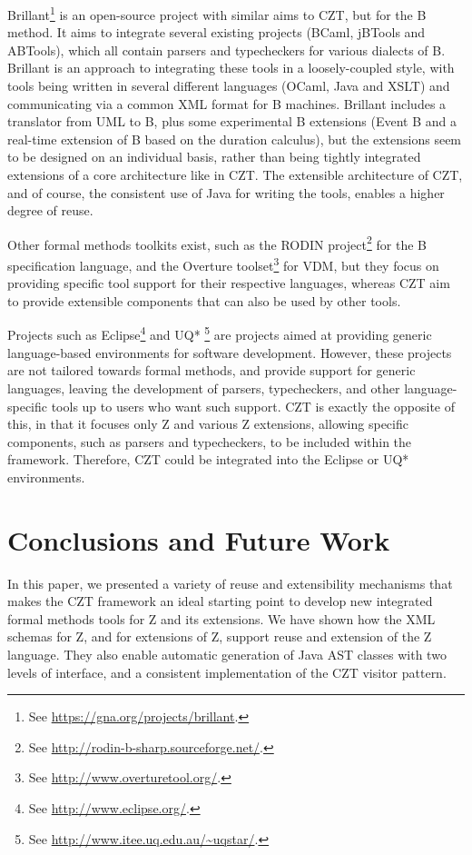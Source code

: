 \documentclass{llncs}
\begin{document}
  Brillant\footnote{See \url{https://gna.org/projects/brillant}.}  is
  an open-source project with similar aims to CZT, but for the B
  method. It aims to integrate several existing projects (BCaml,
  jBTools and ABTools), which all contain parsers and typecheckers for
  various dialects of B.  Brillant is an approach to integrating these
  tools in a loosely-coupled style, with tools being written in
  several different languages (OCaml, Java and XSLT) and communicating
  via a common XML format for B machines.  Brillant includes a
  translator from UML to B, plus some experimental B extensions (Event
  B and a real-time extension of B based on the duration calculus),
  but the extensions seem to be designed on an individual basis,
  rather than being tightly integrated extensions of a core
  architecture like in CZT.  The extensible architecture of CZT, and
  of course, the consistent use of Java for writing the
  tools, enables a higher degree of reuse.

  Other formal methods toolkits exist, such as the RODIN
  project\footnote{See \url{http://rodin-b-sharp.sourceforge.net/}.}
  for the B specification language, and the Overture
  toolset\footnote{See \url{http://www.overturetool.org/}.} for VDM,
  but they focus on providing specific tool support for their
  respective languages, whereas CZT aim to provide extensible
  components that can also be used by other tools.

  Projects such as Eclipse\footnote{See
  \url{http://www.eclipse.org/}.}  and UQ* \footnote{See
  \url{http://www.itee.uq.edu.au/~uqstar/}.} are projects aimed at
  providing generic language-based environments for software
  development. However, these projects are not tailored towards formal
  methods, and provide support for generic languages, leaving the
  development of parsers, typecheckers, and other language-specific tools
  up to users who want such support. CZT is exactly the opposite of this, in
  that it focuses only Z and various Z extensions, allowing specific
  components, such as parsers and typecheckers, to be included within
  the framework. Therefore, CZT could be integrated into the Eclipse
  or UQ* environments.

\section{Conclusions and Future Work} \label{sec:conclusions}

  In this paper, we presented a variety of reuse and extensibility
  mechanisms that makes the CZT framework an ideal starting point to
  develop new integrated formal methods tools for Z and its
  extensions.  We have shown how the XML schemas for Z, and for
  extensions of Z, support reuse and extension of the Z language.
  They also enable automatic generation of Java AST classes with two
  levels of interface, and a consistent implementation of the CZT visitor
  pattern.
\end{document}
